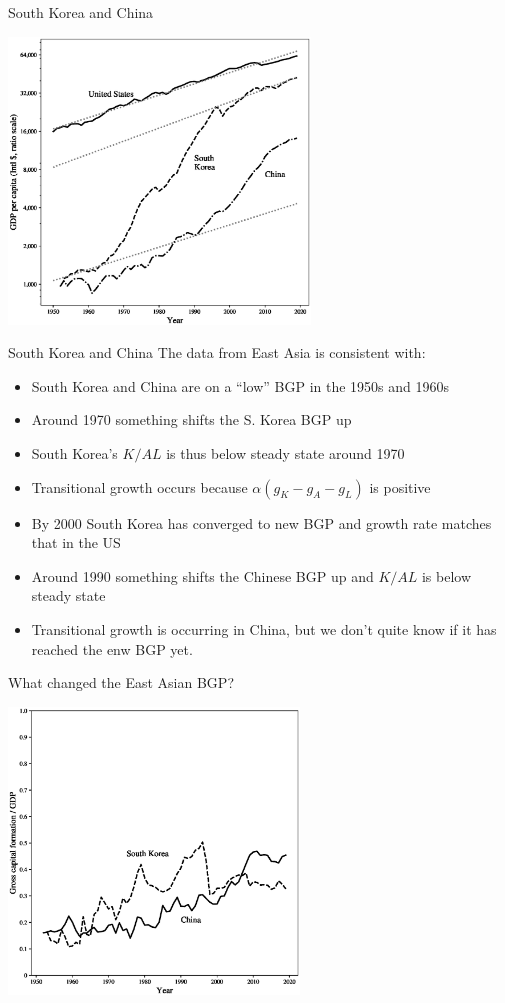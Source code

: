 \begin{frame}{South Korea and China}
\begin{center}
\includegraphics[height = 3in]{../Figures/fig-ch3-fig2.eps}
\end{center}
\end{frame}

\begin{frame}{South Korea and China}
The data from East Asia is consistent with:
\begin{itemize}
	\item South Korea and China are on a ``low'' BGP in the 1950s and 1960s 
	\item Around 1970 something shifts the S. Korea BGP up
	\item South Korea's $K/AL$ is thus below steady state around 1970
	\item Transitional growth occurs because $\alpha(g_K - g_A - g_L)$ is positive
	\item By 2000 South Korea has converged to new BGP and growth rate matches that in the US
	\item Around 1990 something shifts the Chinese BGP up and $K/AL$ is below steady state
	\item Transitional growth is occurring in China, but we don't quite know if it has reached the enw BGP yet.
\end{itemize}
\end{frame}

\begin{frame}{What changed the East Asian BGP?}
\begin{center}
\includegraphics[height = 3in]{../Figures/fig-ch3-fig3.eps}
\end{center}
\end{frame}

